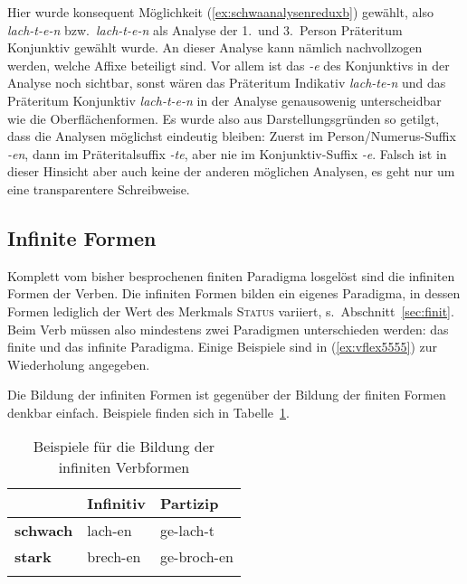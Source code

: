 Hier wurde konsequent Möglichkeit (\ref{ex:schwaanalysenreduxb}) gewählt, also \textit{lach-t-e-n} bzw.\ \textit{lach-t-e-n} als Analyse der 1.\ und 3.\ Person Präteritum Konjunktiv gewählt wurde.
An dieser Analyse kann nämlich nachvollzogen werden, welche Affixe beteiligt sind.
Vor allem ist das \textit{-e} des Konjunktivs in der Analyse noch sichtbar, sonst wären das Präteritum Indikativ \textit{lach-te-n} und das Präteritum Konjunktiv \textit{lach-t-e-n} in der Analyse genausowenig unterscheidbar wie die Oberflächenformen.
Es wurde also aus Darstellungsgründen so getilgt, dass die Analysen möglichst eindeutig bleiben:
Zuerst im Person\slash Numerus-Suffix \textit{-en}, dann im Präteritalsuffix \textit{-te}, aber nie im Konjunktiv-Suffix \textit{-e}.
Falsch ist in dieser Hinsicht aber auch keine der anderen möglichen Analysen, es geht nur um eine transparentere Schreibweise.

\subsection{Infinite Formen}

\label{sec:infinflex}


Komplett vom bisher besprochenen finiten Paradigma losgelöst sind die infiniten Formen der Verben.
Die infiniten Formen bilden ein eigenes Paradigma, in dessen Formen lediglich der Wert des Merkmals \textsc{Status} variiert, s.\ Abschnitt~\ref{sec:finit}.
Beim Verb müssen also mindestens zwei Paradigmen unterschieden werden: das finite und das infinite Paradigma.
Einige Beispiele sind in (\ref{ex:vflex5555}) zur Wiederholung angegeben.

\begin{exe}
  \ex\label{ex:vflex5555}
  \begin{xlist}
  \end{xlist}
\end{exe}

Die Bildung der infiniten Formen ist gegenüber der Bildung der finiten Formen denkbar einfach.
Beispiele finden sich in Tabelle~\ref{tab:vinf-bsp}.


\begin{table}
  \centering
  \begin{tabular}{lll}
    \lsptoprule
    & \textbf{Infinitiv} & \textbf{Partizip} \\
    \midrule
    \textbf{schwach} & lach-en & ge-lach-t\\
    \textbf{stark} & brech-en & ge-broch-en\\
    \lspbottomrule
  \end{tabular}
  \caption{Beispiele für die Bildung der infiniten Verbformen}
  \label{tab:vinf-bsp}
\end{table}

